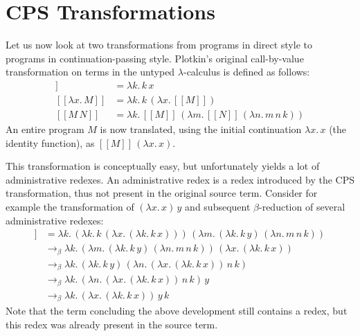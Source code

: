 \documentclass[a4paper,11pt,draft]{article}
\begin{document}
\section{CPS Transformations}\label{sec:transformations}

Let us now look at two transformations from programs in direct style to programs in
continuation-passing style. Plotkin's original call-by-value transformation on terms
in the untyped $\lambda$-calculus is defined as follows:
\begin{align*}
  [\![x]\!]               &= \lambda k. \, k \, x\\
  [\![\lambda x. \, M]\!] &= \lambda k. \, k \, (\lambda x. \, [\![M]\!])\\
  [\![M \, N]\!]          &= \lambda k. \, [\![M]\!] \, (\lambda m. \, [\![N]\!] \, (\lambda n. \, m \, n \, k))
\end{align*}
An entire program $M$ is now translated, using the initial continuation
$\lambda x. \, x$ (the identity function), as
$[\![M]\!] \, (\lambda x. \, x)$.

This transformation is conceptually easy, but unfortunately yields a lot of
administrative redexes. An administrative redex is a redex introduced by the CPS
transformation, thus not present in the original source term. Consider for example
the transformation of $(\lambda x. \, x) \, y$ and subsequent $\beta$-reduction
of several administrative redexes:
\begin{align*}
  [\![(\lambda x. \, x) \, y]\!] &= \lambda k. \, (\lambda k. \, k \, (\lambda x. \, (\lambda k. \, k \, x))) \, (\lambda m. \, (\lambda k. \, k \, y) \,
 (\lambda n. \, m \, n \, k))\\
                                 &\rightarrow_{\beta} \lambda k. \, (\lambda m. \, (\lambda k. \, k \, y) \, (\lambda n. \, m \, n \, k)) \, (\lambda x.
\, (\lambda k. \, k \, x))\\
                                 &\rightarrow_{\beta} \lambda k. \, (\lambda k. \, k \, y) \, (\lambda n. \, (\lambda x. \, (\lambda k. \, k \, x)) \, n
\, k)\\
                                 &\rightarrow_{\beta} \lambda k. \, (\lambda n. \, (\lambda x. \, (\lambda k. \, k \, x)) \, n \, k) \, y\\
                                 &\rightarrow_{\beta} \lambda k. \, (\lambda x. \, (\lambda k. \, k \, x)) \, y \, k
\end{align*}
Note that the term concluding the above development still contains a redex, but
this redex was already present in the source term.
\end{document}
